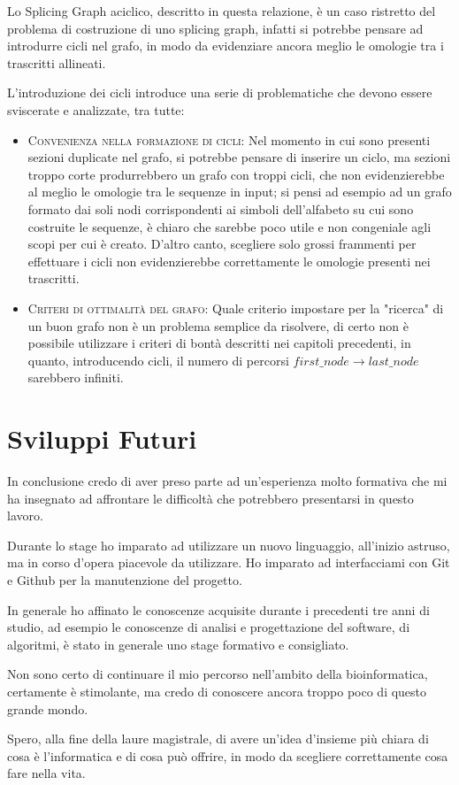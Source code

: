 Lo Splicing Graph aciclico, descritto in questa relazione, è un caso ristretto del problema di costruzione di uno splicing graph, infatti si potrebbe pensare ad introdurre cicli nel grafo, in modo da evidenziare ancora meglio le omologie tra i trascritti allineati.

L'introduzione dei cicli introduce una serie di problematiche che devono essere sviscerate e analizzate, tra tutte:

\begin{itemize}
    \item \textsc{Convenienza nella formazione di cicli}: Nel momento in cui sono presenti sezioni duplicate nel grafo, si potrebbe pensare di inserire un ciclo, ma sezioni troppo corte produrrebbero un grafo con troppi cicli, che non evidenzierebbe al meglio le omologie tra le sequenze in input; si pensi ad esempio ad un grafo formato dai soli nodi corrispondenti ai simboli dell'alfabeto su cui sono costruite le sequenze, è chiaro che sarebbe poco utile e non congeniale agli scopi per cui è creato.
    D'altro canto, scegliere solo grossi frammenti per effettuare i cicli non evidenzierebbe correttamente le omologie presenti nei trascritti.
    \item \textsc{Criteri di ottimalità del grafo}: Quale criterio impostare per la "ricerca" di un buon grafo non è un problema semplice da risolvere, di certo non è possibile utilizzare i criteri di bontà descritti nei capitoli precedenti, in quanto, introducendo cicli, il numero di percorsi $first\_node \to last\_node$ sarebbero infiniti.
\end{itemize}

\newpage

\section{Sviluppi Futuri}

In conclusione credo di aver preso parte ad un'esperienza molto formativa che mi ha insegnato ad affrontare le difficoltà che potrebbero presentarsi in questo lavoro.

Durante lo stage ho imparato ad utilizzare un nuovo linguaggio, all'inizio astruso, ma in corso d'opera piacevole da utilizzare.
Ho imparato ad interfacciami con Git e Github per la manutenzione del progetto.

In generale ho affinato le conoscenze acquisite durante i precedenti tre anni di studio, ad esempio le conoscenze di analisi e progettazione del software, di algoritmi, è stato in generale uno stage formativo e consigliato.

Non sono certo di continuare il mio percorso nell'ambito della bioinformatica, certamente è stimolante, ma credo di conoscere ancora troppo poco di questo grande mondo.

Spero, alla fine della laure magistrale, di avere un'idea d'insieme più chiara di cosa è l'informatica e di cosa può offrire, in modo da scegliere correttamente cosa fare nella vita.